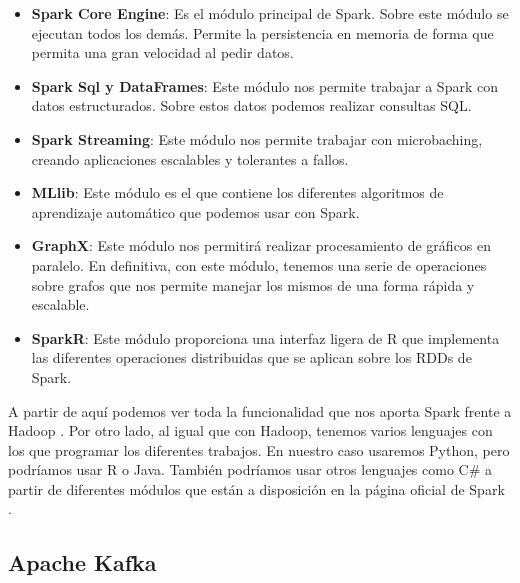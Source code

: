 \begin{itemize}
	\item \textbf{Spark Core Engine}: Es el módulo principal de Spark. Sobre este módulo se ejecutan todos los demás. Permite la persistencia en memoria de forma que permita una gran velocidad al pedir datos.\par
	\item \textbf{Spark Sql y DataFrames}: Este módulo nos permite trabajar a Spark con datos estructurados. Sobre estos datos podemos realizar consultas SQL.\par
	\item \textbf{Spark Streaming}: Este módulo nos permite trabajar con microbaching, creando aplicaciones escalables y tolerantes a fallos.
	\item \textbf{MLlib}: Este módulo es el que contiene los diferentes algoritmos de aprendizaje automático que podemos usar con Spark.
	\item \textbf{GraphX}: Este módulo nos permitirá realizar procesamiento de gráficos en paralelo. En definitiva, con este módulo, tenemos una serie de operaciones sobre grafos que nos permite manejar los mismos de una forma rápida y escalable.
	\item \textbf{SparkR}: Este módulo proporciona una interfaz ligera de R que implementa las diferentes operaciones distribuidas que se aplican sobre los RDDs de Spark.
\end{itemize}

A partir de aquí podemos ver toda la funcionalidad que nos aporta Spark frente a Hadoop \cite{Spk-7}. Por otro lado, al igual que con Hadoop, tenemos varios lenguajes con los que programar los diferentes trabajos. En nuestro caso usaremos Python, pero podríamos usar R o Java. También podríamos usar otros lenguajes como C\# a partir de diferentes módulos que están a disposición en la página oficial de Spark \cite{Spk-6}.\par


\subsection{Apache Kafka\label{Kafka}}

